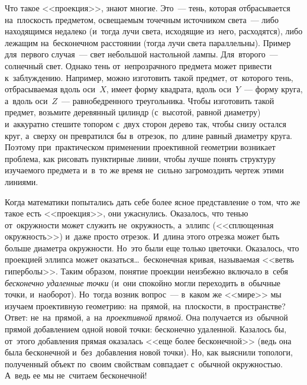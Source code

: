 Что такое <<проекция>>, знают многие. Это~--- тень, которая отбрасывается на~плоскость предметом,
освещаемым точечным источником света~--- либо находящимся недалеко (и~тогда лучи света, исходящие
из~него, расходятся), либо лежащим на~бесконечном расстоянии (тогда лучи света параллельны). Пример
для~первого случая~--- свет небольшой настольной лампы. Для~второго~--- солнечный свет. Однако тень
от~непрозрачного предмета может привести к~заблуждению. Например, можно изготовить такой предмет,
от~которого тень, отбрасываемая вдоль оси~$X$, имеет форму квадрата, вдоль оси~$Y$~--- форму круга,
а~вдоль оси~$Z$~--- равнобедренного треугольника. Чтобы изготовить такой предмет, возьмите деревянный
цилиндр (с~высотой, равной диаметру) и~аккуратно стешите топором с~двух сторон дерево так, чтобы
снизу остался круг, а~сверху он превратился бы в~отрезок, по~длине равный диаметру круга. Поэтому
при~практическом применении проективной геометрии возникает проблема, как рисовать пунктирные
линии, чтобы лучше понять структуру изучаемого предмета и~в~то же время не~сильно загромоздить
чертеж этими линиями.

Когда математики попытались дать себе более ясное представление о том, что же такое есть <<проекция>>, они
ужаснулись. Оказалось, что тенью от~окружности может служить не~окружность, а~эллипс
(<<сплющенная окружность>>) и~даже просто отрезок.
 И~длина этого отрезка может быть больше
диаметра окружности. Но~это были еще только цветочки. Оказалось, что проекцией эллипса может
оказаться\ldots\ бесконечная кривая, называемая <<ветвь гиперболы>>. Таким образом, понятие
проекции неизбежно включало в~себя \textit{бесконечно удаленные точки} (и~они спокойно могли переходить
в~обычные точки, и~наоборот). Но~тогда возник вопрос~--- в~каком же <<мире>> мы изучаем проективную
геометрию: на~прямой, на~плоскости, в~пространстве? Ответ: не~на~прямой, а~на~\textit{проективной прямой}.
Она получается из~обычной прямой добавлением одной новой точки: бесконечно удаленной. Казалось бы,
от~этого добавления прямая оказалась <<еще более бесконечной>> (ведь она была бесконечной
и~без~добавления новой точки). Но, как выяснили топологи, полученный объект по~своим свойствам
совпадает с~обычной окружностью. А~ведь ее мы не~считаем бесконечной!


